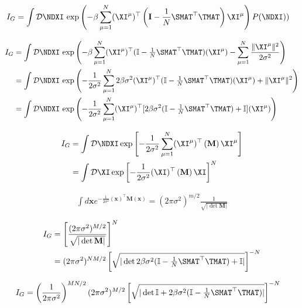 \begin{align}
    \label{eqn:I_1} 
  I_G & = \int \mathcal{D}\NDXI \, \exp \left( -\beta\sum_{\mu=1}^{N} (\XI^{\mu})^{\top} \left(\mathbf{I}-\frac{1}{N} \SMAT^{\top}\TMAT \right) \XI^{\mu} \right) P(\NDXI))
  \end{align}

\begin{align}
 \label{eqn:I_3} 
  I_G
  &= \int \mathcal{D}\NDXI \, \exp \left(
    -\beta\sum_{\mu=1}^{N} (\XI^{\mu})^{\top} (\mathbb{I}-\tfrac{1}{N}\SMAT^{\top}\TMAT) (\XI^{\mu}) 
    - \sum_{\mu=1}^{N} \frac{\|\XI^{\mu}\|^2}{2 \sigma^2} \right) \\ \nonumber
 &= \int \mathcal{D}\NDXI \, \exp \left(
    -\frac{1}{2\sigma^2}\sum_{\mu=1}^{N}2\beta\sigma^{2} (\XI^{\mu})^{\top} (\mathbb{I}-\tfrac{1}{N}\SMAT^{\top}\TMAT) (\XI^{\mu}) 
    +  \Vert\XI^{\mu}\Vert^{2} \right) \\ \nonumber
    &= \int \mathcal{D}\NDXI \, \exp \left(
    -\frac{1}{2\sigma^2}      
      \sum_{\mu=1}^{N}
          (\XI^{\mu})^{\top}[
      2\beta\sigma^{2} (\mathbb{I}-\tfrac{1}{N}\SMAT^{\top}\TMAT)+\mathbb{I}] (\XI^{\mu})\right) 
\end{align}

\begin{align}
  \label{eqn:I_4} 
  I_G
  &=  \int \mathcal{D}\NDXI 
  \exp\left[
    -\frac{1}{2\sigma^2}\sum_{\mu=1}^{N}(\XI^{\mu})^{\top}
    \left(\mathbf{M}
    \right)
    \XI^{\mu}
    \right ]\\ \nonumber
  &=  \int \mathcal{D}\XI  
 \exp\left[
    -\frac{1}{2\sigma^2}(\XI)^{\top}
    \left(\mathbf{M}
    \right)
    \XI
    \right]^{N} 
\end{align}

\begin{align}
  \label{eqn:det_M}
\int d\mathbf{x}  e^{-\frac{1}{2\sigma^{2}}(\mathbf{x})^{\top}\mathbf{M}(\mathbf{x}) } = (2\pi\sigma^{2})^{m/2}\frac{1}{\sqrt{|\det \mathbf{M}|}}
\end{align}

\begin{align}
  \label{eqn:I_5}
  I_G &=   \left[\frac{(2\pi\sigma^{2})^{M/2}}{\sqrt{|\det \mathbf{M}|}}\right]^{N} \\ \nonumber
  &=   (2\pi\sigma^2)^{NM/2}\left[
    \sqrt{|\det 2\beta\sigma^2(\mathbb{I}-\tfrac{1}{N}\SMAT^{\top}\TMAT)+\mathbb{I}|}\right]^{-N}
\end{align}

\begin{align}
  \label{eqn:I_6}
  I_G &=  
  \left( \frac{1}{2\pi\sigma^{2}} \right)^{MN/2}
  (2\pi \sigma^{2})^{M/2}
    \left[\sqrt{|\det \mathbb{I} + 2\beta\sigma^{2}(\mathbb{I}-\tfrac{1}{N}\SMAT^{\top}\TMAT)|}\right]^{-N}
\end{align}


